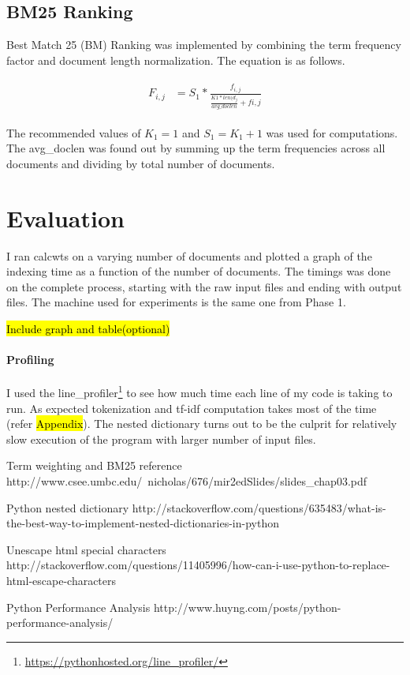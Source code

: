 \documentclass[paper=a4, fontsize=11pt]{scrartcl}
\numberwithin{equation}{section}		%
\numberwithin{figure}{section}			%
\numberwithin{table}{section}				%
\begin{document}
\subsection{BM25 Ranking}

Best Match 25 (BM) Ranking was implemented by combining the term frequency factor and document length normalization. The equation is as follows.

\begin{align} 
	\begin{split}
	F_{i, j} 	&= S_{1} * \frac{f_{i,j}}{\frac{K1 * len(d_{j}}{avg\_doclen} + f{i,j}}
	\end{split}					
\end{align} 

The recommended values of $K_{1} = 1$ and $S_{1} = K_{1} + 1$ was used for computations. The avg\_doclen was found out by summing up the term frequencies across all documents and dividing by total number of documents.

\section{Evaluation}

I ran calcwts on a varying number of documents and plotted a graph of the indexing time as a function of the number of documents. The timings was done on the complete process, starting with the raw input files and ending with output files. The machine used for experiments is the same one from Phase 1.

\hl{Include graph and table(optional)}

\paragraph{Profiling}

I used the line\_profiler\footnote{\url{https://pythonhosted.org/line_profiler/}} to see how much time each line of my code is taking to run. As expected tokenization and tf-idf computation takes most of the time (refer \hl{Appendix}). The nested dictionary turns out to be the culprit for relatively slow execution of the program with larger number of input files. 

\begin{thebibliography}{1}

 Term weighting and BM25 reference http://www.csee.umbc.edu/~nicholas/676/mir2edSlides/slides\_chap03.pdf

 Python nested dictionary http://stackoverflow.com/questions/635483/what-is-the-best-way-to-implement-nested-dictionaries-in-python
  
   Unescape html special characters http://stackoverflow.com/questions/11405996/how-can-i-use-python-to-replace-html-escape-characters

   Python Performance Analysis http://www.huyng.com/posts/python-performance-analysis/

  \end{thebibliography}

\end{document}
